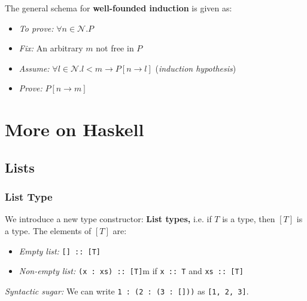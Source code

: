 \documentclass[a4paper]{extarticle}
\begin{document}
The general schema for \textbf{well-founded induction} is given as:

\begin{itemize}
    \item \textit{To prove:} \(\forall n \in \mathcal{N}.P\)
    \item \textit{Fix:} An arbitrary \(m\) not free in \(P\)
    \item \textit{Assume:} \(\forall l \in \mathcal{N} . l < m \to P[n \to l]\) (\textit{induction hypothesis})
    \item \textit{Prove:} \(P[n \to m]\)
\end{itemize}

\section{More on Haskell}

\subsection{Lists}

\subsubsection{List Type}

We introduce a new type constructor: \textbf{List types,} i.e. if \(T\) is a type, then \([T]\) is a type. The elements of \([T]\) are:

\begin{itemize}
    \item \textit{Empty list:} \verb|[] :: [T]|
    \item \textit{Non-empty list:} \verb|(x : xs) :: [T]|m if \verb|x :: T| and \verb|xs :: [T]|
\end{itemize}

\textit{Syntactic sugar:} We can write \verb|1 : (2 : (3 : []))| as \verb|[1, 2, 3]|.
\end{document}
